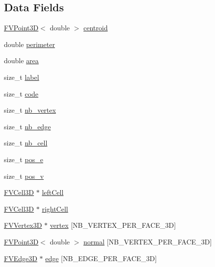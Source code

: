 \subsection*{Data Fields}
\begin{DoxyCompactItemize}
\item 
\hyperlink{classFVPoint3D}{FVPoint3D}$<$ double $>$ \hyperlink{classFVFace3D_af0e77c00d990c1a712cf032be1bb8f0f}{centroid}
\item 
double \hyperlink{classFVFace3D_a079d8fd569c3406fb63e0511eb0338c0}{perimeter}
\item 
double \hyperlink{classFVFace3D_ae517bffd82b9428b4f1d9500ea01c04f}{area}
\item 
size\_\-t \hyperlink{classFVFace3D_a1ec973463c76e6d9e91160720959ad68}{label}
\item 
size\_\-t \hyperlink{classFVFace3D_acf258c3b3328a96e3ee1e3b875b7874f}{code}
\item 
size\_\-t \hyperlink{classFVFace3D_a0a063e99fbc85e837d93dfbcda6f5252}{nb\_\-vertex}
\item 
size\_\-t \hyperlink{classFVFace3D_a71d1c26cc375a03060b9eb8453a3680a}{nb\_\-edge}
\item 
size\_\-t \hyperlink{classFVFace3D_a1a5a11cfc8bbaa0cf132759c0382da70}{nb\_\-cell}
\item 
size\_\-t \hyperlink{classFVFace3D_a6320f7771a5dd32537e636a23fbf7e7c}{pos\_\-e}
\item 
size\_\-t \hyperlink{classFVFace3D_a9edf0688f0159bed5d3a6828f63146fd}{pos\_\-v}
\item 
\hyperlink{classFVCell3D}{FVCell3D} $\ast$ \hyperlink{classFVFace3D_a21a17acd25e8b790315d31bb141824f8}{leftCell}
\item 
\hyperlink{classFVCell3D}{FVCell3D} $\ast$ \hyperlink{classFVFace3D_aca0787b6acdd2934da16d4a600f75732}{rightCell}
\item 
\hyperlink{classFVVertex3D}{FVVertex3D} $\ast$ \hyperlink{classFVFace3D_ac405432b9a986bb191c3eda7e7163a60}{vertex} \mbox{[}NB\_\-VERTEX\_\-PER\_\-FACE\_\-3D\mbox{]}
\item 
\hyperlink{classFVPoint3D}{FVPoint3D}$<$ double $>$ \hyperlink{classFVFace3D_aa492e5327e0487055f0a989431eefc0d}{normal} \mbox{[}NB\_\-VERTEX\_\-PER\_\-FACE\_\-3D\mbox{]}
\item 
\hyperlink{classFVEdge3D}{FVEdge3D} $\ast$ \hyperlink{classFVFace3D_a68ec0a4d9b6476bcf7e6da7dc19d4b75}{edge} \mbox{[}NB\_\-EDGE\_\-PER\_\-FACE\_\-3D\mbox{]}
\end{DoxyCompactItemize}


